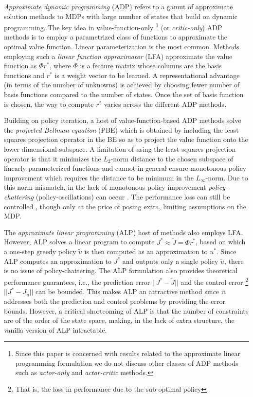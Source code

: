 \emph{Approximate dynamic programming} (ADP) \cite{dpchapter,powell} 
	refers to a gamut of approximate solution methods to MDPs with large number of states
	that build on dynamic programming.
The key idea in value-function-only%
\footnote{
		Since this paper is concerned with results related to the approximate linear programming formulation we do not 
		discuss other classes of ADP methods such as \emph{actor-only} and \emph{actor-critic} methods.} 
	(or \emph{critic-only}) ADP methods is to employ a parametrized class of functions
	to approximate the optimal value function.
Linear parameterization is the most common.
Methods employing such a \emph{linear function approximator} (LFA) 
	approximate the value function as $\Phi r^*$, 
	where $\Phi$ is a feature matrix whose columns are the basis functions 
	and $r^*$ is a weight vector to be learned. 
A representational advantage (in terms of the number of unknowns) 
	is achieved by choosing fewer number of basis functions compared to the number of states. 
Once the set of basis function is chosen, 
	the way to compute $r^*$ varies across the different ADP methods.

Building on policy iteration, a host of value-function-based ADP methods solve 
	the \emph{projected Bellman equation} (PBE) 
	which is obtained by including the least squares projection operator in the BE 
	so as to project the value function onto the lower dimensional subspace. 
A limitation of using the least squares projection operator is that 
	it minimizes the $L_2$-norm distance to the chosen subspace of linearly parameterized functions 
	and cannot in general ensure monotonous policy improvement 
	which requires the distance to be minimum in the $L_\infty$-norm. 
Due to this norm mismatch, in the lack of monotonous policy improvement 
	\emph{policy-chattering} (policy-oscillations) can occur \cite{dpchapter}. 
The performance loss can still be controlled \cite{FaMuSz10}, 
	though only at the price of posing extra, limiting assumptions on the MDP. 
	
The \emph{approximate linear programming} (ALP) \cite{ALP,CS,SALP,ALP-Bor,gkp,fs,npalp} host of methods 
	also employs LFA. 
However, ALP solves a linear program to compute $J^*\approx\tilde{J}=\Phi r^*$, 
	based on which a one-step greedy policy $\tilde{u}$ is then computed as an approximation to $u^*$. 
Since ALP computes an approximation to $J^*$ and outputs only a single policy $\tilde{u}$, 
	there is no issue of policy-chattering. 
The ALP formulation also provides theoretical performance guarantees, 
	i.e., the prediction error $||J^*-\tilde{J}||$ and the control error%
	\footnote{That is, the loss in performance due to the sub-optimal policy} 
	$||J^*-J_{\tilde{u}}||$ can be bounded. 
This makes ALP an attractive method since it addresses both the prediction 
	and control problems by providing the error bounds. 
However, a critical shortcoming of ALP is 
	that the number of constraints are of the order of the state space, 
	making, in the lack of extra structure, 
	the vanilla version of ALP intractable.

